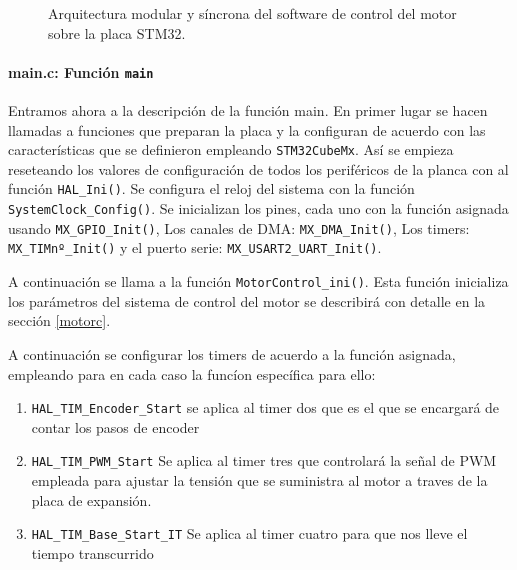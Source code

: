 \begin{figure}
{
}
\shorthandon{<}
\shorthandon{>}
    \caption{Arquitectura modular y síncrona del software de control del motor sobre la placa STM32.}
    \label{fig:arquitectura_motor_perfecta}
\end{figure}

\paragraph{main.c: Función \texttt{main}} Entramos ahora a la descripción de la función main. En primer lugar se hacen llamadas a funciones que preparan la placa y la configuran de acuerdo con las características que se definieron empleando \texttt{STM32CubeMx}. Así se empieza reseteando los valores de configuración de todos los periféricos de la planca con al función \texttt{HAL\_Ini()}. Se configura el reloj del sistema con la función \texttt{SystemClock\_Config()}. Se inicializan los pines, cada uno con la función asignada usando \texttt{MX\_GPIO\_Init()}, Los canales de DMA: \texttt{MX\_DMA\_Init()}, Los timers: \texttt{MX\_TIMnº\_Init()} y el puerto serie: \texttt{MX\_USART2\_UART\_Init()}.

A continuación se llama a la función \texttt{MotorControl\_ini()}. Esta función inicializa los parámetros del sistema de control del motor se describirá con detalle en la sección \ref{motorc}.

A continuación se configurar los timers de acuerdo a la función asignada, empleando para en cada caso la funcíon específica para ello:
\begin{enumerate}
    \item \texttt{HAL\_TIM\_Encoder\_Start} se aplica al timer dos que es el que se encargará de contar los pasos de encoder
    \item \texttt{HAL\_TIM\_PWM\_Start} Se aplica al timer tres que controlará la señal de PWM empleada para ajustar la tensión que se suministra al motor a traves de la placa de expansión.
    \item \texttt{HAL\_TIM\_Base\_Start\_IT} Se aplica al timer cuatro para que nos lleve el tiempo transcurrido 
\end{enumerate}

